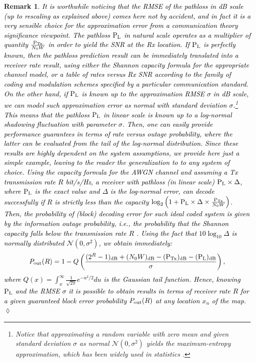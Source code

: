 \documentclass[10pt,a4paper]{article}
\newtheorem{remark}{Remark}
\begin{document}
\begin{remark}
\textcolor{black}{It is worthwhile noticing that the RMSE of the pathloss in dB scale (up to rescaling as explained above) comes here not by accident, and in fact it is a very sensible choice for the approximation error from a communication theory significance viewpoint. 
The pathloss $\textup{P}_{\textup{L}}$ in natural scale operates as a multiplier of quantity $\frac{\textup{P}_{\textup{Tx}}}{N_0W}$ in order to yield the SNR at the Rx location.
If $\textup{P}_{\textup{L}}$ is perfectly known, then the pathloss prediction result can be immediately translated into a receiver rate result, using either the Shannon capacity formula for the appropriate channel model, 
or a table of rates versus Rx SNR according to the family of coding and modulation schemes 
specified by a particular communication standard. 
On the other hand, if $\textup{P}_{\textup{L}}$ is known up to the approximation RMSE $\sigma$ in dB scale, we can model such approximation error as normal with standard deviation $\sigma$.\footnote{Notice that approximating a random variable with zero mean and given standard deviation $\sigma$ as normal $\mathcal{N}(0,\sigma^2)$ yields the maximum-entropy approximation, which has been widely used in statistics \cite{cover1999elements}.}
This means that the pathloss $\textup{P}_{\textup{L}}$ in linear scale is known up to a log-normal shadowing fluctuation 
with parameter $\sigma$. Then, one can easily provide performance guarantees in terms of rate 
versus outage probability, where the latter can be evaluated from the tail of the 
log-normal distribution. Since these results are highly dependent on the system assumptions, 
we provide here just a simple example, leaving to the reader the generalization to to any system
of choice. Using the capacity formula for the AWGN channel and assuming a Tx transmission rate 
$R$ bit/s/Hz, a receiver with pathloss (in linear scale) $\textup{P}_{\textup{L}} \times \Delta$, 
where $\textup{P}_{\textup{L}}$ is the exact value and $\Delta$ is the log-normal error, 
can decode successfully if $R$ is strictly less than  
the capacity $\log_2 \left ( 1 + \textup{P}_{\textup{L}} \times \Delta \times \frac{\textup{P}_{\textup{Tx}}}{N_0W} \right )$. 
Then, the probability of (block) decoding error for such ideal 
coded system is given by the {\em information outage probability}, i.e., the probability that the 
Shannon capacity falls below the transmission rate $R$ \cite{biglieri1998fading}. 
Using the fact that $10 \log_{10} \Delta$ is normally distributed $\mathcal{N}(0, \sigma^2)$, we obtain immediately: \[ P_{\rm out}(R) = 1 - Q \left ( \frac{(2^R-1)_{\rm dB} + (N_0 W)_{\rm dB} - (\textup{P}_{\textup{Tx}})_{\rm dB} - (\textup{P}_{\textup{L}})_{\rm dB}}{\sigma} \right ),  \]
where $Q(x) = \int_x^\infty \frac{1}{\sqrt{2\pi}} e^{-u^2/2} du$ is the Gaussian tail function. 
Hence, knowing $\textup{P}_{\textup{L}}$ and the RMSE $\sigma$ it is possible to obtain 
results in terms of receiver rate $R$ for a given guaranteed 
block error probability $P_{\rm out}(R)$ at any location $x_n$ of the map. 
\hfill $\lozenge$}
\end{remark}
\end{document}
